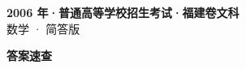 \documentclass[zihao=-4, a4paper]{ctexart}
\begin{document}
\begin{center}
  {\Large\bfseries 2006 年·普通高等学校招生考试·福建卷文科}\\[4pt]
  {\large 数学 · 简答版}
\end{center}
\medskip
{}

\clearpage
{}
\begin{center}{\Large\bfseries 答案速查}\end{center}
\medskip

\end{document}

